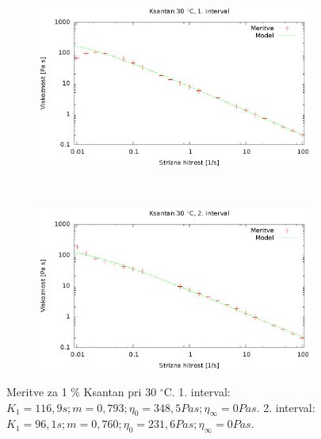 \documentclass{article}
\begin{document}
\begin{figure}[H]
	\centering
	\begin{subfigure}[b]{0.45\textwidth}
	       \includegraphics[width=\textwidth]{cross_ksan3.eps}
	   \end{subfigure}
	   ~
	   \begin{subfigure}[b]{0.45\textwidth}
	       \includegraphics[width=\textwidth]{cross_ksan4.eps}
	   \end{subfigure}
	\caption{Meritve za 1 \% Ksantan pri 30 $^\circ$C. 1. interval: $K_1 = 116,9 s; m = 0,793; \eta_0 = 348,5 Pa s; \eta_\infty = 0 Pa s$. 2. interval: $K_1 = 96,1 s; m = 0,760; \eta_0 = 231,6 Pa s; \eta_\infty = 0 Pa s$.}
	\label{fig:cross_xan2}
\end{figure}
\end{document}
